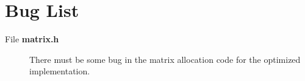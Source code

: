 \section{Bug List}\label{bug}
\label{_bug000001}
\begin{description}
\item[File {\bf matrix.h} ]
There must be some bug in the matrix allocation code for the optimized implementation.\end{description}
 